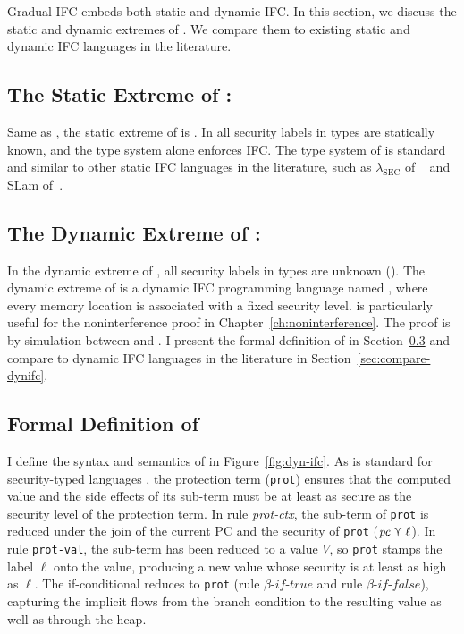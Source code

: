 {\color{NavyBlue}  %
Gradual IFC embeds both static and dynamic IFC. In this section, we discuss the
static and dynamic extremes of \Surface. We compare them to existing static and
dynamic IFC languages in the literature.

\subsection{The Static Extreme of \Surface: \SSLRef}

Same as \GSLRef, the static extreme of \Surface is \SSLRef. In \SSLRef all
security labels in types are statically known, and the type system alone
enforces IFC. The type system of \SSLRef is standard and similar to other static
IFC languages in the literature, such as $\lambda_{\text{SEC}}$ of
~\textcite{zdancewic2002programming} and SLam of~\textcite{heintze1998slam}.

\subsection{The Dynamic Extreme of \Surface: \DynIFC}

In the dynamic extreme of \GSLRef, all security labels in types are unknown
(\unk). The dynamic extreme of \GSLRef is a dynamic IFC programming language
named \DynIFC, where every memory location is associated with a fixed security
level. \DynIFC is particularly useful for the noninterference proof in
Chapter~\ref{ch:noninterference}. The proof is by simulation between \CC and
\DynIFC. I present the formal definition of \DynIFC in
Section~\ref{sec:def-dynifc} and compare \DynIFC to dynamic IFC languages in the
literature in Section~\ref{sec:compare-dynifc}.

\subsection{Formal Definition of \DynIFC}
\label{sec:def-dynifc}

I define the syntax and semantics of \DynIFC in Figure~\ref{fig:dyn-ifc}. As is
standard for security-typed languages \parencite{heintze1998slam,
  Fennell:2013ab, Toro:2018aa}, the protection term (\texttt{prot}) ensures that
the computed value and the side effects of its sub-term must be at least as
secure as the security level of the protection term. In rule \textit{prot-ctx},
the sub-term of \texttt{prot} is reduced under the join of the current PC and
the security of \texttt{prot} ($\mathit{pc} \curlyvee \ell$). In rule \texttt{prot-val},
the sub-term has been reduced to a value $V$, so \texttt{prot} stamps the label
$\ell$ onto the value, producing a new value whose security is at least as high
as $\ell$. The if-conditional reduces to \texttt{prot} (rule
$\beta\textit{-if-true}$ and rule $\beta\textit{-if-false}$), capturing the
implicit flows from the branch condition to the resulting value as well as
through the heap.

}
